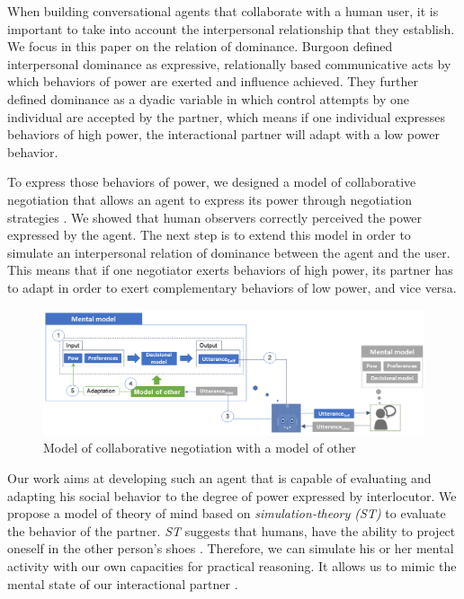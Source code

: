 \documentclass[conference, letterpaper]{IEEEtran}
\begin{document}
		When building conversational agents that collaborate with a human user, it is important  to take into account the interpersonal relationship that they establish. We focus in this paper on the relation of dominance. Burgoon \cite{burgoon1998nature} defined interpersonal dominance as expressive, relationally based communicative acts by which behaviors of power are exerted and influence achieved. They further defined dominance as a dyadic variable in which control attempts by one individual are accepted by the partner, which means if one individual expresses behaviors of high power, the interactional partner will adapt with a low power behavior. 
	
		To express those behaviors of power, we designed a model of collaborative negotiation that allows an agent to express its power through negotiation strategies \cite{ouali2017computational}. We showed that human observers correctly perceived the power expressed by the agent.
		The next step is to extend this model in order to simulate an interpersonal relation of dominance between the agent and the user. This means that if one negotiator exerts behaviors of high power, its partner has to adapt in order to exert complementary behaviors of low power, and vice versa.
		
		\begin{figure}[h]
			\centering
			\includegraphics[width=0.8\linewidth]{figs/model/general.png}
			\caption{Model of collaborative negotiation with a model of other} 
			\label{fig:schema-general}
		\end{figure} 
	
		Our work aims at developing such an agent that is capable of evaluating and adapting his social behavior to the degree of power expressed by interlocutor. We propose a model of theory of mind based on \emph{simulation-theory (ST)} \cite{gordon1986folk} to evaluate the behavior of the partner. \emph{ST} suggests that humans, have the ability to project oneself in the other person’s shoes \cite{shanton2010simulation}. Therefore, we can simulate his or her mental activity with our own capacities for practical reasoning. It allows us to mimic the mental state of our interactional partner \cite{harbers2009modeling}.%
		  
\end{document}
